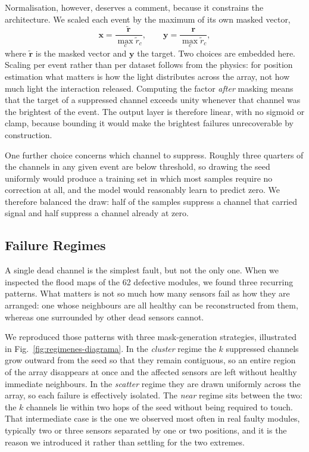 \documentclass[10pt,conference]{IEEEtran}
\begin{document}
Normalisation, however, deserves a comment, because it constrains the
architecture. We scaled each event by the maximum of its own masked vector,
%
\begin{equation}
\mathbf{x} = \frac{\tilde{\mathbf{r}}}{\max_{c} \tilde{r}_{c}},
\qquad
\mathbf{y} = \frac{\mathbf{r}}{\max_{c} \tilde{r}_{c}},
\label{eq:norm}
\end{equation}
%
where $\tilde{\mathbf{r}}$ is the masked vector and $\mathbf{y}$ the target.
Two choices are embedded here. Scaling per event rather than per dataset
follows from the physics: for position estimation what matters is how the light
distributes across the array, not how much light the interaction released.
Computing the factor \emph{after} masking means that the target of a suppressed
channel exceeds unity whenever that channel was the brightest of the event.
The output layer is therefore linear, with no sigmoid or clamp, because
bounding it would make the brightest failures unrecoverable by construction.

One further choice concerns which channel to suppress. Roughly three quarters
of the channels in any given event are below threshold, so drawing the seed
uniformly would produce a training set in which most samples require no
correction at all, and the model would reasonably learn to predict zero. We
therefore balanced the draw: half of the samples suppress a channel that
carried signal and half suppress a channel already at zero.

\subsection{Failure Regimes}
\label{sec:regimes}

A single dead channel is the simplest fault, but not the only one. When we
inspected the flood maps of the 62 defective modules, we found three recurring
patterns. What matters is not so much how many sensors fail as how they are
arranged: one whose neighbours are all healthy can be reconstructed from them,
whereas one surrounded by other dead sensors cannot.

We reproduced those patterns with three mask-generation strategies, illustrated
in Fig.~\ref{fig:regimenes-diagrama}. In the \emph{cluster} regime the $k$
suppressed channels grow outward from the seed so that they remain contiguous,
so an entire region of the array disappears at once and the affected sensors
are left without healthy immediate neighbours. In the \emph{scatter} regime
they are drawn uniformly across the array, so each failure is effectively
isolated. The \emph{near} regime sits between the two: the $k$ channels lie
within two hops of the seed without being required to touch. That intermediate case is the one we observed most often in real faulty
modules, typically two or three sensors separated by one or two positions, and
it is the reason we introduced it rather than settling for the two extremes.
\end{document}
